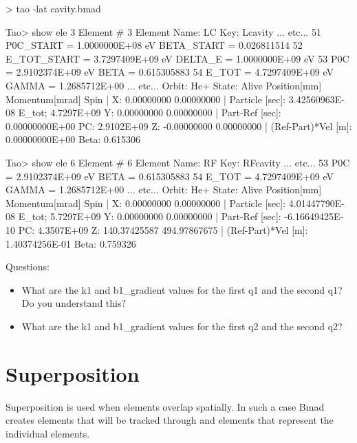 \documentclass{hitec}
\newcommand{\Section}[1]{\section{#1}\vspace*{-1ex}}
\begin{document}
\begin{code}
> tao -lat cavity.bmad

Tao> show ele 3
Element #                3
Element Name: LC
Key: Lcavity
... etc...
   51   P0C_START                    =  1.0000000E+08 eV            BETA_START      =  0.026811514
   52   E_TOT_START                  =  3.7297409E+09 eV            DELTA_E         =  1.0000000E+09 eV
   53   P0C                          =  2.9102374E+09 eV            BETA            =  0.615305883
   54   E_TOT                        =  4.7297409E+09 eV            GAMMA           =  1.2685712E+00
... etc...    
Orbit:  He+   State: Alive
         Position[mm] Momentum[mrad]        Spin   |
  X:       0.00000000     0.00000000               | Particle [sec]:      3.42560963E-08  E_tot;  4.7297E+09
  Y:       0.00000000     0.00000000               | Part-Ref [sec]:      0.00000000E+00  PC:     2.9102E+09
  Z:      -0.00000000     0.00000000               | (Ref-Part)*Vel [m]:  0.00000000E+00  Beta:    0.615306

Tao> show ele 6
Element #                6
Element Name: RF
Key: RFcavity
... etc...
   53   P0C                          =  2.9102374E+09 eV            BETA            =  0.615305883
   54   E_TOT                        =  4.7297409E+09 eV            GAMMA           =  1.2685712E+00
... etc...
 Orbit:  He+   State: Alive
         Position[mm] Momentum[mrad]        Spin   |
  X:       0.00000000     0.00000000               | Particle [sec]:      4.01447790E-08  E_tot;  5.7297E+09
  Y:       0.00000000     0.00000000               | Part-Ref [sec]:     -6.16649425E-10  PC:     4.3507E+09
  Z:     140.37425587   494.97867675               | (Ref-Part)*Vel [m]:  1.40374256E-01  Beta:    0.759326
\end{code}

Questions:
\begin{itemize}
\item What are the k1 and b1_gradient values for the first q1 and the second q1? Do you understand this?
\item What are the k1 and b1_gradient values for the first q2 and the second q2?
\end{itemize}

\Section{Superposition}

Superposition is used when elements overlap spatially. In such a case Bmad creates  elements that will be tracked through
and  elements that represent the individual elements.
\end{document}

